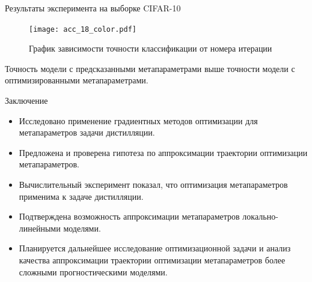 \documentclass[10pt, aspectratio=169]{beamer}
\begin{document}
\begin{frame}{Результаты эксперимента на выборке CIFAR-10}
\begin{figure}
    \caption*{График зависимости точности классификации от номера итерации}
    \texttt{[image: acc\_18\_color.pdf]}
\end{figure}
Точность модели с предсказанными метапараметрами выше точности модели с оптимизированными метапараметрами.
\end{frame}
\begin{frame}{Заключение}
    \begin{itemize}
        \item Исследовано применение градиентных методов оптимизации для метапараметров задачи дистилляции.
        \item Предложена и проверена гипотеза по аппроксимации траектории оптимизации метапараметров. 
        \item Вычислительный эксперимент показал, что оптимизация метапараметров применима к задаче дистилляции. 
        \item Подтверждена возможность аппроксимации метапараметров локально-линейными моделями. 
        \item Планируется дальнейшее исследование оптимизационной задачи и анализ качества  аппроксимации траектории оптимизации метапараметров более сложными прогностическими моделями.
    \end{itemize}
\end{frame}


\end{document}
